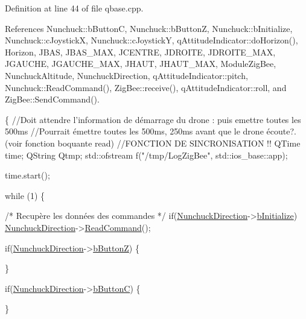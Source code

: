 Definition at line 44 of file qbase.\-cpp.



References Nunchuck\-::b\-Button\-C, Nunchuck\-::b\-Button\-Z, Nunchuck\-::b\-Initialize, Nunchuck\-::c\-Joystick\-X, Nunchuck\-::c\-Joystick\-Y, q\-Attitude\-Indicator\-::do\-Horizon(), Horizon, J\-B\-A\-S, J\-B\-A\-S\-\_\-\-M\-A\-X, J\-C\-E\-N\-T\-R\-E, J\-D\-R\-O\-I\-T\-E, J\-D\-R\-O\-I\-T\-E\-\_\-\-M\-A\-X, J\-G\-A\-U\-C\-H\-E, J\-G\-A\-U\-C\-H\-E\-\_\-\-M\-A\-X, J\-H\-A\-U\-T, J\-H\-A\-U\-T\-\_\-\-M\-A\-X, Module\-Zig\-Bee, Nunchuck\-Altitude, Nunchuck\-Direction, q\-Attitude\-Indicator\-::pitch, Nunchuck\-::\-Read\-Command(), Zig\-Bee\-::receive(), q\-Attitude\-Indicator\-::roll, and Zig\-Bee\-::\-Send\-Command().


\begin{DoxyCode}
\{
    \textcolor{comment}{//Doit attendre l'information de démarrage du drone : puis emettre toutes
       les 500ms}
    \textcolor{comment}{//Pourrait émettre toutes les 500ms, 250ms avant que le drone écoute?.
       (voir fonction boquante read)}
    \textcolor{comment}{//FONCTION DE SINCRONISATION !!}
    QTime time;
    QString Qtmp;
    std::ofstream    f(\textcolor{stringliteral}{"/tmp/LogZigBee"}, std::ios\_base::app);

    time.start();

    \textcolor{keywordflow}{while} (1) \{

        \textcolor{comment}{/* Recupère les données des commandes */}
        \textcolor{keywordflow}{if}(\hyperlink{classQBase_aa39545ef1795a91bf18db836cde0640d}{NunchuckDirection}->\hyperlink{classNunchuck_a3ecbcb3a01a247605b4f0a37b579581d}{bInitialize})
            \hyperlink{classQBase_aa39545ef1795a91bf18db836cde0640d}{NunchuckDirection}->\hyperlink{classNunchuck_ade6607a55fda6ae67c90d3d1ee7ce56b}{ReadCommand}();

        \textcolor{keywordflow}{if}(\hyperlink{classQBase_aa39545ef1795a91bf18db836cde0640d}{NunchuckDirection}->\hyperlink{classNunchuck_a0db1f3d2f58fafda23a5af3936c12598}{bButtonZ}) \{

        \}

        \textcolor{keywordflow}{if}(\hyperlink{classQBase_aa39545ef1795a91bf18db836cde0640d}{NunchuckDirection}->\hyperlink{classNunchuck_a1d5cac3b603b3060984e3184d795561d}{bButtonC}) \{

        \}


\end{DoxyCode}
